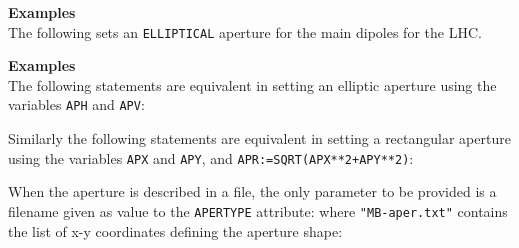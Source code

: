 \vskip 5mm

\begin{5.02.04}
{\bf Examples}\\
The following sets an {\tt ELLIPTICAL} aperture for the main
dipoles for the LHC.
\end{5.02.04}

\begin{5.02.05}
{\bf Examples}\\
The following statements are equivalent in setting an elliptic aperture 
using the variables {\tt APH} and {\tt APV}:

Similarly the following statements are equivalent in setting a rectangular 
aperture using the variables {\tt APX} and {\tt APY}, 
and {\tt APR:=SQRT(APX**2+APY**2)}:


\end{5.02.05}

When the aperture is described in a file, the only parameter to be provided is 
a filename given as value to the {\tt APERTYPE} attribute:
where {\tt "MB-aper.txt"} contains the list of x-y coordinates defining the
aperture shape:

